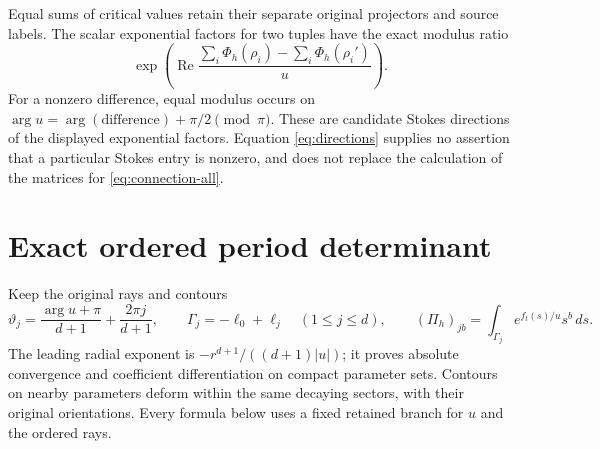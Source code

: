 \documentclass[11pt]{article}
\begin{document}
Equal sums of critical values retain their separate original projectors
and source labels.  The scalar exponential factors for two tuples have
the exact modulus ratio
\begin{equation}
 \exp\!\left(\operatorname{Re}
      \frac{\sum_i\Phi_h(\rho_i)-\sum_i\Phi_h(\rho_i')}{u}\right).
 \label{eq:directions}
\end{equation}
For a nonzero difference, equal modulus occurs on
$\arg u=\arg(\text{difference})+\pi/2\pmod\pi$.
These are candidate Stokes directions of the displayed exponential
factors.  Equation \eqref{eq:directions} supplies no assertion that a
particular Stokes entry is nonzero, and does not replace the calculation
of the matrices for \eqref{eq:connection-all}.

\section{Exact ordered period determinant}

Keep the original rays and contours
\begin{equation}
 \vartheta_j=\frac{\arg u+\pi}{d+1}+\frac{2\pi j}{d+1},
 \qquad \Gamma_j=-\ell_0+\ell_j\quad(1\le j\le d),
 \qquad
 (\Pi_h)_{jb}=\int_{\Gamma_j}e^{f_t(s)/u}s^b\,ds.
 \label{eq:period}
\end{equation}
The leading radial exponent is
$-r^{d+1}/((d+1)|u|)$; it proves absolute convergence and
coefficient differentiation on compact parameter sets.  Contours on
nearby parameters deform within the same decaying sectors, with their
original orientations.  Every formula below uses a fixed retained
branch for $u$ and the ordered rays.
\end{document}
